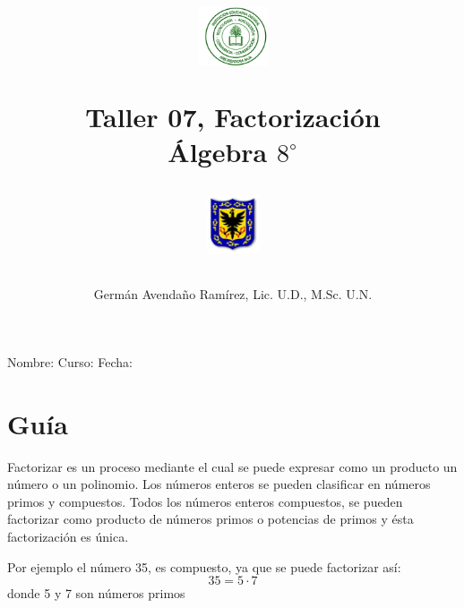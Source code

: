 \documentclass[10pt,twoside]{article}
\author{Germ\'an Avenda\~no Ram\'irez, Lic. U.D., M.Sc. U.N.}
\title{\begin{minipage}{.2\textwidth}
\includegraphics[height=1.75cm]{Images/logo-colegio.png}\end{minipage}
\begin{minipage}{.55\textwidth}
\begin{center}
Taller 07, Factorización  \\
Álgebra $8^{\circ}$
\end{center}
\end{minipage}\hfill
\begin{minipage}{.2\textwidth}
\includegraphics[height=1.75cm]{Images/logo-sed.png} 
\end{minipage}}
\date{}
\begin{document}
\maketitle
Nombre: \hrulefill Curso: \underline{\hspace*{44pt}} Fecha: \underline{\hspace*{2.5cm}}
\section*{Gu\'{i}a}
Factorizar es un proceso mediante el cual se puede expresar como un producto un número o un polinomio. Los números enteros se pueden clasificar en números primos y compuestos. Todos los números enteros compuestos, se pueden factorizar como producto de números primos o potencias de primos y ésta factorización es única.

Por ejemplo el número 35, es compuesto, ya que se puede factorizar así:
\[35=5\cdot 7\]
donde 5 y 7 son números primos
\end{document}
